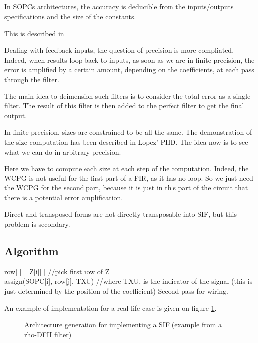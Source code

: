 \subsection{}

In SOPCs architectures, the accuracy is deducible from the inputs/outputs specifications and the size of the constants.

This is described in %

Dealing with feedback inputs, the question of precision is more compliated.
Indeed, when results loop back to inputs, as soon as we are in finite precision, the error is amplified by a certain amount, depending on the coefficients, at each pass through the filter.

The main idea to deimension such filters is to consider the total error as a single filter.
The result of this filter is then added to the perfect filter to get the final output.

In finite precision, sizes are constrained to be all the same. The demonstration of the size computation has been described in Lopez' PHD.
The idea now is to see what we can do in arbitrary precision.

Here we have to compute each size at each step of the computation. Indeed, the WCPG is not useful for the first part of a FIR, as it has no loop.
So we just need the WCPG for the second part, because it is just in this part of the circuit that there is a potential error amplification.

Direct and transposed forms are not directly transposable into SIF, but this problem is secondary.

\subsection{Algorithm}

	\begin{algorithm}[H]
	 {
	 	row[ ]= Z[i][ ] //pick first row of Z \\
	 	 {
	 		assign(SOPC[i], row[j], TXU) //where TXU, is the indicator of the signal (this is just determined by the position of the coefficient)
	 	}
		Second pass for wiring.
	}
	\end{algorithm}

	An example of implementation for a real-life case is given on figure \ref{fig:SIFimpl}.

	\begin{figure}[!h]
	\begin{center}
	\scalebox{6}{}
	\end{center}
	\caption{ Architecture generation for implementing a SIF (example from a rho-DFII filter) \label{fig:SIFimpl}}
	\end{figure}

